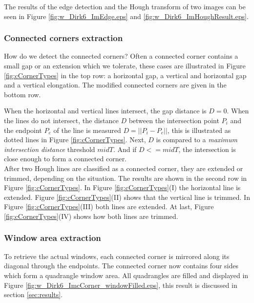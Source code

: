 The results of the edge detection and the Hough transform of two images can be seen in Figure \ref{fig:w_Dirk6_ImEdge.eps} and
 \ref{fig:w_Dirk6_ImHoughResult.eps}.


\subsubsection{Connected corners extraction}
How do we detect the connected corners?
Often a connected corner contains a small gap or an extension which we tolerate,
these cases are illustrated in Figure \ref{fig:cCornerTypes} in the top row:
a horizontal gap, a vertical and horizontal gap and a vertical elongation. The
modified connected corners are given in the bottom row.  

When the horizontal and
vertical lines intersect, the gap distance is $D=0$.  When the lines do not
intersect, the distance $D$ between the intersection point $P_i$ and the endpoint $P_e$ of the
line is measured $D = ||P_i-P_e||$, this is illustrated as dotted lines in Figure
\ref{fig:cCornerTypes}.  Next, $D$ is compared to a \emph{maximum intersection
distance} threshold $midT$.  And if $D<=midT$, the intersection is close enough
to form a connected corner.\\

After two Hough lines are classified as a connected corner, they are extended or
trimmed, depending on the situation. The results are shown in the second row in
Figure \ref{fig:cCornerTypes}.
In Figure \ref{fig:cCornerTypes}(I)  the horizontal line is extended.  Figure
\ref{fig:cCornerTypes}(II) shows that the vertical line is trimmed.  In Figure
\ref{fig:cCornerTypes}(III) both lines are extended.  At last, Figure
\ref{fig:cCornerTypes}(IV) shows how both lines are trimmed.


\subsubsection{Window area extraction}
To retrieve the actual windows, each connected corner is mirrored along its 
diagonal through the endpoints. The connected corner now contains four sides which form a 
quadrangle window area.
All quadrangles are filled and displayed in Figure
\ref{fig:w_Dirk6_ImcCorner_windowFilled.eps}, this result is discussed in section
\ref{sec:results}.


